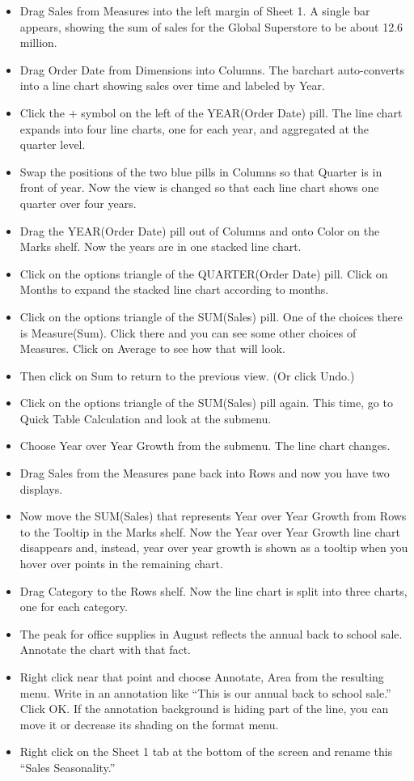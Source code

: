 \begin{itemize}
\tightlist
\item
  Drag Sales from Measures into the left margin of Sheet 1. A single bar
  appears, showing the sum of sales for the Global Superstore to be
  about 12.6 million.
\item
  Drag Order Date from Dimensions into Columns. The barchart
  auto-converts into a line chart showing sales over time and labeled by
  Year.
\item
  Click the \(+\) symbol on the left of the YEAR(Order Date) pill. The
  line chart expands into four line charts, one for each year, and
  aggregated at the quarter level.
\item
  Swap the positions of the two blue pills in Columns so that Quarter is
  in front of year. Now the view is changed so that each line chart
  shows one quarter over four years.
\item
  Drag the YEAR(Order Date) pill out of Columns and onto Color on the
  Marks shelf. Now the years are in one stacked line chart.
\item
  Click on the options triangle of the QUARTER(Order Date) pill. Click
  on Months to expand the stacked line chart according to months.
\item
  Click on the options triangle of the SUM(Sales) pill. One of the
  choices there is Measure(Sum). Click there and you can see some other
  choices of Measures. Click on Average to see how that will look.
\item
  Then click on Sum to return to the previous view. (Or click Undo.)
\item
  Click on the options triangle of the SUM(Sales) pill again. This time,
  go to Quick Table Calculation and look at the submenu.
\item
  Choose Year over Year Growth from the submenu. The line chart changes.
\item
  Drag Sales from the Measures pane back into Rows and now you have two
  displays.
\item
  Now move the SUM(Sales) that represents Year over Year Growth from
  Rows to the Tooltip in the Marks shelf. Now the Year over Year Growth
  line chart disappears and, instead, year over year growth is shown as
  a tooltip when you hover over points in the remaining chart.
\item
  Drag Category to the Rows shelf. Now the line chart is split into
  three charts, one for each category.
\item
  The peak for office supplies in August reflects the annual back to
  school sale. Annotate the chart with that fact.
\item
  Right click near that point and choose Annotate, Area from the
  resulting menu. Write in an annotation like ``This is our annual back
  to school sale.'' Click OK. If the annotation background is hiding
  part of the line, you can move it or decrease its shading on the
  format menu.
\item
  Right click on the Sheet 1 tab at the bottom of the screen and rename
  this ``Sales Seasonality.''
\end{itemize}

